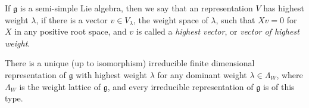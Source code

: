 \documentclass[12pt]{article}
\begin{document}
If $\mathfrak{g}$ is a semi-simple Lie algebra, then we say that an  representation $V$
has highest weight $\lambda$, if there is a vector $v\in V_\lambda$, the weight space of
$\lambda$, such that $Xv=0$ for $X$ in any positive root space, and $v$ is called a {\em highest 
vector}, or {\em vector of highest weight}.

There is a unique (up to isomorphism) irreducible
finite dimensional representation of $\mathfrak{g}$ with highest weight $\lambda$ for any dominant
weight $\lambda\in\Lambda_W$, where $\Lambda_W$ is the weight lattice of $\mathfrak{g}$, and
every irreducible representation of $\mathfrak{g}$ is of this type.
\end{document}
